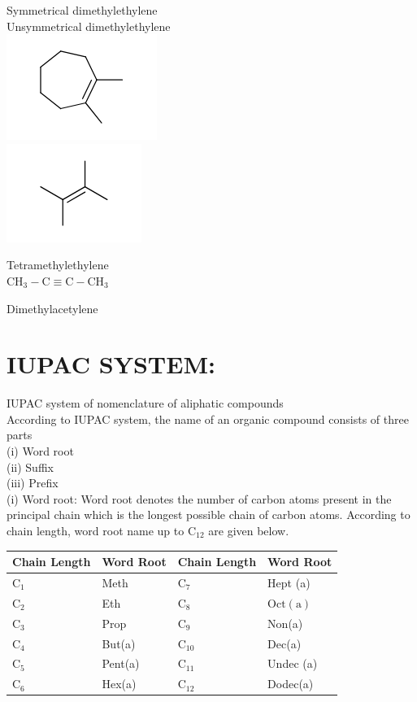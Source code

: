 \documentclass[10pt]{article}
\begin{document}
Symmetrical dimethylethylene\\
Unsymmetrical dimethylethylene\\
\includegraphics{smile-805c5486bbfb7e76d897bb7f7e321b6571bb85b0}\\
\includegraphics{smile-f2f0dfedd787696375209135885445722830bbff}

Tetramethylethylene\\
$\mathrm{CH}_{3}-\mathrm{C} \equiv \mathrm{C}-\mathrm{CH}_{3}$

Dimethylacetylene

\section*{IUPAC SYSTEM:}
IUPAC system of nomenclature of aliphatic compounds\\
According to IUPAC system, the name of an organic compound consists of three parts\\
(i) Word root\\
(ii) Suffix\\
(iii) Prefix\\
(i) Word root: Word root denotes the number of carbon atoms present in the principal chain which is the longest possible chain of carbon atoms. According to chain length, word root name up to $\mathrm{C}_{12}$ are given below.

\begin{center}
\begin{tabular}{|l|l|l|l|}
\hline
Chain Length & Word Root & Chain Length & Word Root \\
\hline
$\mathrm{C}_{1}$ & Meth & $\mathrm{C}_{7}$ & Hept (a) \\
$\mathrm{C}_{2}$ & Eth & $\mathrm{C}_{8}$ & $\operatorname{Oct(a)}$ \\
$\mathrm{C}_{3}$ & Prop & $\mathrm{C}_{9}$ & Non(a) \\
$\mathrm{C}_{4}$ & But(a) & $\mathrm{C}_{10}$ & Dec(a) \\
$\mathrm{C}_{5}$ & Pent(a) & $\mathrm{C}_{11}$ & Undec (a) \\
$\mathrm{C}_{6}$ & Hex(a) & $\mathrm{C}_{12}$ & Dodec(a) \\
\hline
\end{tabular}
\end{center}
\end{document}
